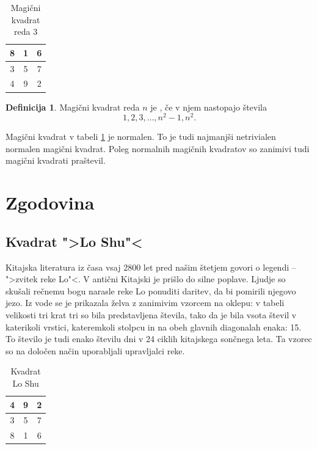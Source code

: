 \documentclass[a4paper,12pt]{article}
\theoremstyle{definition}
\newtheorem{definicija}{Definicija}
\theoremstyle{plain}
\newcommand{\pojem}[1]{\emph{\color{purple}{#1}}}
\newenvironment{magic}[3]
   {\begin{table}[!ht]
      \caption{#2}
      \label{#3}
      \centering
      \begin{tabular}{|*{#1}{c|}}
      \hline}
   {\end{tabular}\end{table}}
\begin{document}
\begin{magic}{3}{Magični kvadrat reda 3}{table:mag3}
   8 & 1 & 6 \\\hline
   3 & 5 & 7 \\\hline
   4 & 9 & 2 \\\hline
\end{magic}


\begin{definicija}
   Magični kvadrat reda $n$ je \pojem{normalen}, če v njem nastopajo števila
   \begin{equation}
      \label{eq:numbers}
      1, 2, 3, \ldots, n^2-1, n^2.
   \end{equation}
\end{definicija}

Magični kvadrat v tabeli \ref{table:mag3} je normalen.
To je tudi najmanjši netrivialen normalen magični kvadrat.
Poleg normalnih magičnih kvadratov so zanimivi tudi magični kvadrati praštevil.


\section{Zgodovina}

\subsection{Kvadrat ">Lo Shu"<}

Kitajska literatura iz časa vsaj 2800 let pred našim štetjem govori o legendi
\pojem{Lo Shu} -- ">zvitek reke Lo"<. V antični Kitajski je prišlo do
silne poplave. Ljudje so skušali rečnemu bogu narasle reke Lo ponuditi daritev,
da bi pomirili njegovo jezo. Iz vode se je prikazala želva z zanimivim vzorcem
na oklepu: v tabeli velikosti tri krat tri so bila predstavljena števila, tako
da je bila vsota števil v katerikoli vrstici, kateremkoli stolpcu in na obeh
glavnih diagonalah enaka: 15. To število je tudi enako številu dni v 24 ciklih
kitajskega sončnega leta. Ta vzorec so na določen način uporabljali upravljalci
reke.

   \begin{magic}{3}{Kvadrat Lo Shu}{table:loshu}
      4 & 9 & 2 \\\hline
      3 & 5 & 7 \\\hline
      8 & 1 & 6 \\\hline
   \end{magic}
\end{document}
